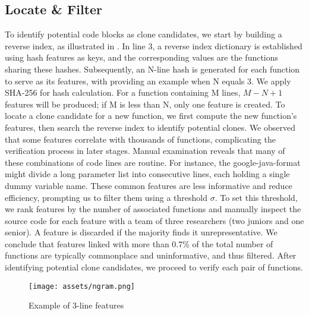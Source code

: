 \subsection{Locate \& Filter}\label{sec:locate}
To identify potential code blocks as clone candidates, we start by building a reverse index, as illustrated in . In line 3, a reverse index dictionary is established using hash features as keys, and the corresponding values are the functions sharing these hashes. Subsequently, an N-line hash is generated for each function to serve as its features, with  providing an example when N equals 3. We apply SHA-256 for hash calculation. For a function containing M lines, $M - N + 1$ features will be produced; if M is less than N, only one feature is created. To locate a clone candidate for a new function, we first compute the new function's features, then search the reverse index to identify potential clones. We observed that some features correlate with thousands of functions, complicating the verification process in later stages. Manual examination reveals that many of these combinations of code lines are routine. For instance, the google-java-format might divide a long parameter list into consecutive lines, each holding a single dummy variable name. These common features are less informative and reduce efficiency, prompting us to filter them using a threshold $\sigma$. To set this threshold, we rank features by the number of associated functions and manually inspect the source code for each feature with a team of three researchers (two juniors and one senior). A feature is discarded if the majority finds it unrepresentative. We conclude that features linked with more than 0.7\% of the total number of functions are typically commonplace and uninformative, and thus filtered. After identifying potential clone candidates, we proceed to verify each pair of functions.

\begin{figure}
    \centering
    \texttt{[image: assets/ngram.png]}
    \caption{Example of 3-line features }
    \label{fig:nline}
\end{figure}

